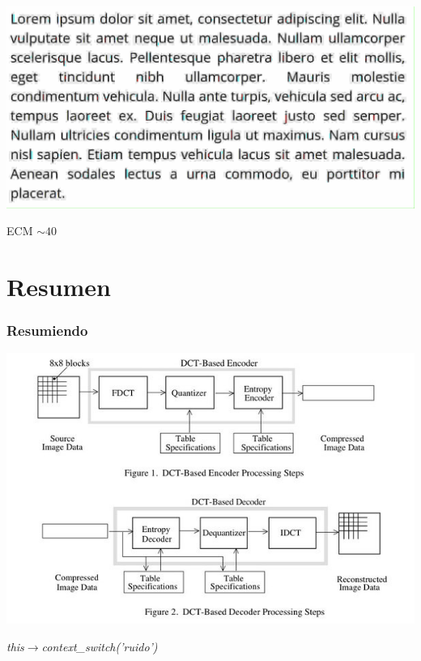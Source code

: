 \documentclass{beamer}
\begin{document}
\begin{frame}
    \begin{center}
        \includegraphics[scale=0.2]{fig/txt_80.png}


        \vfill
        {\small ECM $\sim 40$}

    \end{center}

\end{frame}


\section{Resumen}
\begin{frame}
    \frametitle{Resumiendo}
    \begin{center}
        \includegraphics[scale=0.45]{fig/steps.jpeg}
    \end{center}
\end{frame}

\begin{frame}
    \begin{center}
        \textit{this$\rightarrow$context\_switch('ruido')}
    \end{center}
\end{frame}
\end{document}
